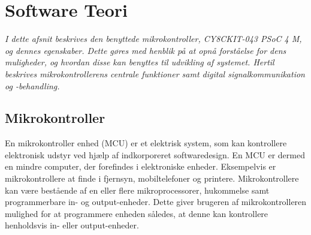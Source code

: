 \section{Software Teori}
\textit{I dette afsnit beskrives den benyttede mikrokontroller, CY8CKIT-043 PSoC 4 M, og dennes egenskaber. Dette gøres med henblik på at opnå forståelse for dens muligheder, og hvordan disse kan benyttes til udvikling af systemet. Hertil beskrives mikrokontrollerens centrale funktioner samt digital signalkommunikation og -behandling.}

\subsection{Mikrokontroller}
En mikrokontroller enhed (MCU) er et elektrisk system, som kan kontrollere elektronisk udstyr ved hjælp af indkorporeret softwaredesign. En MCU er dermed en mindre computer, der forefindes i elektroniske enheder. Eksempelvis er mikrokontrollere at finde i fjernsyn, mobiltelefoner og printere. \citep{Scienceuddannelse,Tanenbaum2006} \newline
Mikrokontrollere kan være bestående af en eller flere mikroprocessorer, hukommelse samt programmerbare in- og output-enheder. Dette giver brugeren af mikrokontrolleren mulighed for at programmere enheden således, at denne kan kontrollere henholdsvis in- eller output-enheder. \citep{Scienceuddannelse,Tanenbaum2006}

